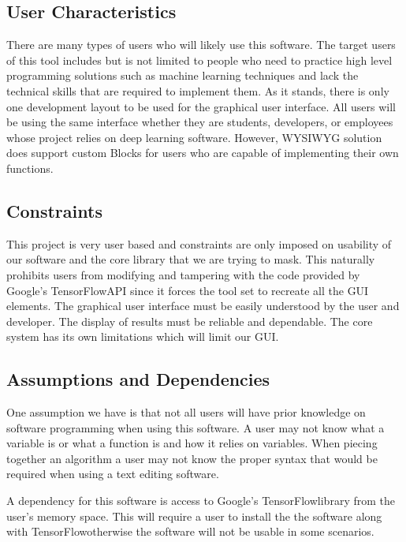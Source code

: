 \documentclass[journal,10pt,onecolumn,compsoc]{IEEEtran} \usepackage[margin=1.0in]{geometry} \usepackage{pdfpages} \usepackage{graphicx}
\begin{document}
\subsection{User Characteristics}

There are many types of users who will likely use this software. 
The target users of this tool includes but is not limited to people who need to practice high level programming solutions such as machine learning techniques and lack the technical skills that are required to implement them.
As it stands, there is only one development layout to be used for the graphical user interface.
All users will be using the same interface whether they are students, developers, or employees whose project relies on deep learning software. 
However, WYSIWYG solution does support custom Blocks for users who are capable of implementing their own functions.

\subsection{Constraints}

This project is very user based and constraints are only imposed on usability of our software and the core library that we are trying to mask. 
This naturally prohibits users from modifying and tampering with the code provided by Google's TensorFlow\texttrademark API since it forces the tool set to recreate all the GUI elements.
The graphical user interface must be easily understood by the user and developer.
The display of results must be reliable and dependable.
The core system has its own limitations which will limit our GUI.

\subsection{Assumptions and Dependencies}

One assumption we have is that not all users will have prior knowledge on software programming when using this software.
A user may not know what a variable is or what a function is and how it relies on variables. 
When piecing together an algorithm a user may not know the proper syntax that would be required when using a text editing software.

\noindent A dependency for this software is access to Google's TensorFlow\texttrademark library from the user's memory space. 
This will require a user to install the the software along with TensorFlow\texttrademark otherwise the software will not be usable in some scenarios.
\end{document}
